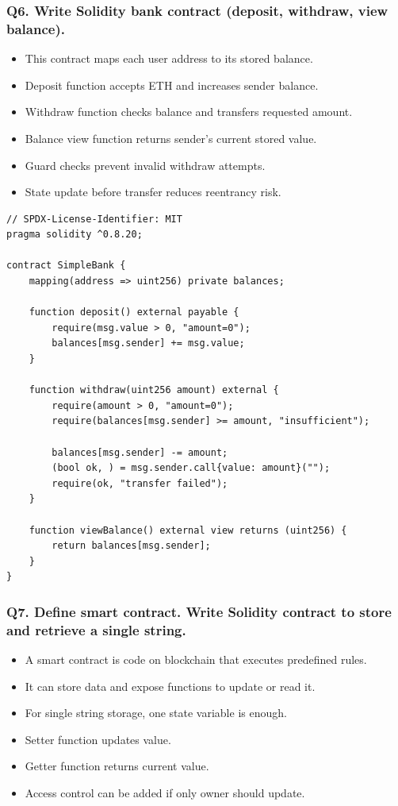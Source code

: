 \documentclass[12pt,a4paper]{article}
\begin{document}
\subsubsection*{Q6. Write Solidity bank contract (deposit, withdraw, view balance).}
\begin{itemize}
\item This contract maps each user address to its stored balance.
\item Deposit function accepts ETH and increases sender balance.
\item Withdraw function checks balance and transfers requested amount.
\item Balance view function returns sender's current stored value.
\item Guard checks prevent invalid withdraw attempts.
\item State update before transfer reduces reentrancy risk.
\end{itemize}

\begin{lstlisting}
// SPDX-License-Identifier: MIT
pragma solidity ^0.8.20;

contract SimpleBank {
    mapping(address => uint256) private balances;

    function deposit() external payable {
        require(msg.value > 0, "amount=0");
        balances[msg.sender] += msg.value;
    }

    function withdraw(uint256 amount) external {
        require(amount > 0, "amount=0");
        require(balances[msg.sender] >= amount, "insufficient");

        balances[msg.sender] -= amount;
        (bool ok, ) = msg.sender.call{value: amount}("");
        require(ok, "transfer failed");
    }

    function viewBalance() external view returns (uint256) {
        return balances[msg.sender];
    }
}
\end{lstlisting}

\subsubsection*{Q7. Define smart contract. Write Solidity contract to store and retrieve a single string.}
\begin{itemize}
\item A smart contract is code on blockchain that executes predefined rules.
\item It can store data and expose functions to update or read it.
\item For single string storage, one state variable is enough.
\item Setter function updates value.
\item Getter function returns current value.
\item Access control can be added if only owner should update.
\end{itemize}
\end{document}
